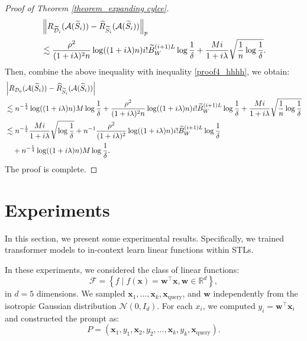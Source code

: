 \begin{proof}[Proof of Theorem \ref{theorem_expanding cylce}]
\begin{align}
 &\left\|R_{\widetilde{\mathcal{D}}_i}(\mathcal{A}(\widetilde{S}_i))-\widehat{R}_{\widetilde{S}_i}(\mathcal{A}(\widetilde{S}_i))\right\|_{p} \notag \\
 &\lesssim  \frac{\rho^2}{(1+i\lambda)^2n} \log ((1+i\lambda) n)i!\widetilde{B}_W^{(i+1) L}\log\frac{1}{\delta}+\frac{Mi}{1+i\lambda} \sqrt{\frac{1}{n}\log\frac{1}{\delta}}. \notag
\end{align}
Then, combine the above inequality with inequality \ref{proof4_hhhh}, we obtain:
\begin{align}
    &\left|R_{\mathcal{D}_0}(\mathcal{A}(\widetilde{S}_i))-\widehat{R}_{\widetilde{S}_i}(\mathcal{A}(\widetilde{S}_i))\right|\notag \\
    &\lesssim n^{-\frac{1}{4}}\log ((1+i\lambda)n)M\log\frac{1}{\delta}+ \frac{\rho^2}{(1+i\lambda)^2n} \log ((1+i\lambda) n)i!\widetilde{B}_W^{(i+1) L}\log\frac{1}{\delta}+\frac{Mi}{1+i\lambda} \sqrt{\frac{1}{n}\log\frac{1}{\delta}}  \notag\\
    &\lesssim n^{-\frac{1}{2}} \frac{M i}{1+i \lambda} \sqrt{\log \frac{1}{\delta}}+n^{-1}\frac{\rho^2}{(1+i\lambda)^2} \log ((1+i\lambda) n)i!\widetilde{B}_W^{(i+1) L}\log\frac{1}{\delta}\notag \\
    &\quad+n^{-\frac{1}{4}}\log ((1+i\lambda)n)M\log\frac{1}{\delta}\notag.
\end{align}
The proof is complete.



\end{proof}


\section{Experiments}
In this section, we present some experimental results. Specifically, we trained transformer models to in-context learn linear functions within STLs.

In these experiments, we considered the class of linear functions:
\[
\mathcal{F} = \left\{ f \mid f(\boldsymbol{x}) = \boldsymbol{w}^\top \boldsymbol{x}, \boldsymbol{w} \in \mathbb{R}^d \right\},  
\]
in \(d = 5\) dimensions. We sampled \(\boldsymbol{x}_1, \ldots, \boldsymbol{x}_k, \boldsymbol{x}_{\text{query}}\), and \(\boldsymbol{w}\) independently from the isotropic Gaussian distribution \(\mathcal{N}(0, I_d)\). For each \(x_i\), we computed \(y_i = \boldsymbol{w}^\top \boldsymbol{x}_i\) and constructed the prompt as:
\[
P = (\boldsymbol{x}_1, y_1, \boldsymbol{x}_2, y_2, \ldots, \boldsymbol{x}_k, y_k, \boldsymbol{x}_{\text{query}}).  
\]

